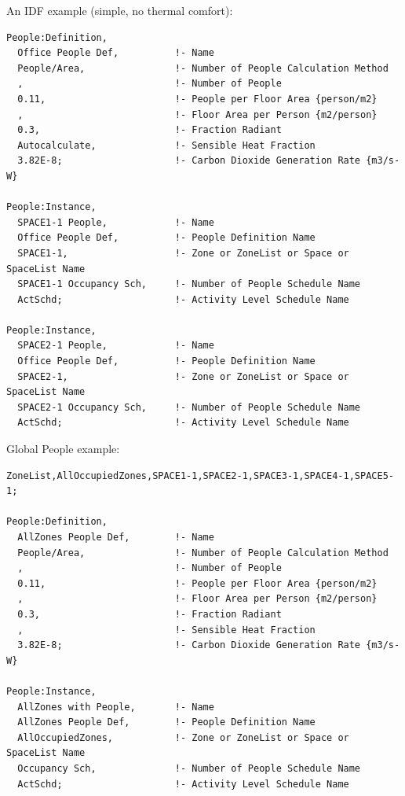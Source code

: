 An IDF example (simple, no thermal comfort):

\begin{lstlisting}
People:Definition,
  Office People Def,          !- Name
  People/Area,                !- Number of People Calculation Method
  ,                           !- Number of People
  0.11,                       !- People per Floor Area {person/m2}
  ,                           !- Floor Area per Person {m2/person}
  0.3,                        !- Fraction Radiant
  Autocalculate,              !- Sensible Heat Fraction
  3.82E-8;                    !- Carbon Dioxide Generation Rate {m3/s-W}

People:Instance,
  SPACE1-1 People,            !- Name
  Office People Def,          !- People Definition Name
  SPACE1-1,                   !- Zone or ZoneList or Space or SpaceList Name
  SPACE1-1 Occupancy Sch,     !- Number of People Schedule Name
  ActSchd;                    !- Activity Level Schedule Name

People:Instance,
  SPACE2-1 People,            !- Name
  Office People Def,          !- People Definition Name
  SPACE2-1,                   !- Zone or ZoneList or Space or SpaceList Name
  SPACE2-1 Occupancy Sch,     !- Number of People Schedule Name
  ActSchd;                    !- Activity Level Schedule Name
\end{lstlisting}

Global People example:

\begin{lstlisting}
ZoneList,AllOccupiedZones,SPACE1-1,SPACE2-1,SPACE3-1,SPACE4-1,SPACE5-1;

People:Definition,
  AllZones People Def,        !- Name
  People/Area,                !- Number of People Calculation Method
  ,                           !- Number of People
  0.11,                       !- People per Floor Area {person/m2}
  ,                           !- Floor Area per Person {m2/person}
  0.3,                        !- Fraction Radiant
  ,                           !- Sensible Heat Fraction
  3.82E-8;                    !- Carbon Dioxide Generation Rate {m3/s-W}

People:Instance,
  AllZones with People,       !- Name
  AllZones People Def,        !- People Definition Name
  AllOccupiedZones,           !- Zone or ZoneList or Space or SpaceList Name
  Occupancy Sch,              !- Number of People Schedule Name
  ActSchd;                    !- Activity Level Schedule Name
\end{lstlisting}

